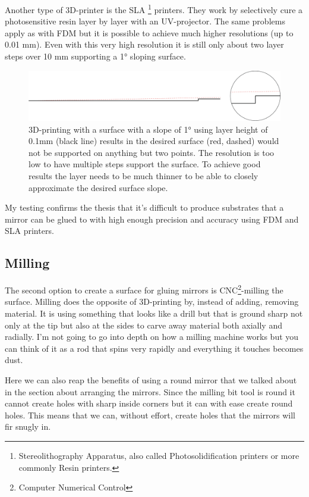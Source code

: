 \documentclass{article}
\begin{document}
Another type of 3D-printer is the SLA \footnote{Stereolithography
  Apparatus, also called Photosolidification printers or more commonly
  Resin printers.} printers. They work by selectively cure a
photosensitive resin layer by layer with an UV-projector. The same problems apply as with FDM
but it is possible to achieve much higher resolutions (up to 0.01 mm).
Even with this very high resolution it is still only about two layer
steps over 10 mm supporting a 1° sloping surface.

\begin{figure}[ht!]
\centering
\includegraphics{images/layer-lines-01mm.png}
\caption{3D-printing with a surface with a slope of 1° using layer height of 0.1mm (black line) results in the desired surface (red, dashed) would not be supported on anything but two points. The resolution is too low to have multiple steps support the surface. To achieve good results the layer needs to be much thinner to be able to closely approximate the desired surface slope.}
\end{figure}


My testing confirms the thesis that it's difficult to produce substrates
that a mirror can be glued to with high enough precision and accuracy
using FDM and SLA printers.


\subsection{Milling}

The second option to create a surface for gluing mirrors is
CNC\footnote{Computer Numerical Control}-milling the surface. Milling
does the opposite of 3D-printing by, instead of adding, removing
material. It is using something that looks like a drill but that is
ground sharp not only at the tip but also at the sides to carve away
material both axially and radially. I'm not going to go into depth on how a milling machine works
but you can think of it as a rod that spins very rapidly and everything
it touches becomes dust.

Here we can also reap the benefits of using a round mirror that we talked about in the section about arranging the mirrors. 
Since the milling bit tool is round it cannot create holes with sharp inside corners but it can with ease create round holes.
This means that we can, without effort, create holes that the mirrors will fir snugly in. 
\end{document}
